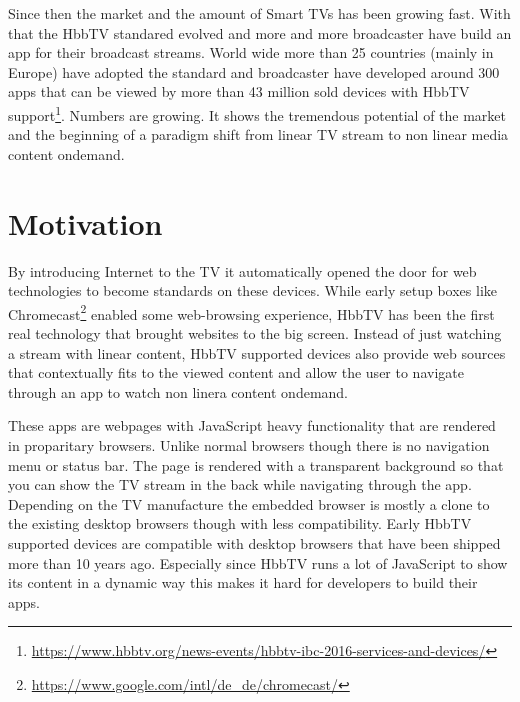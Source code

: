 Since then the market and the amount of Smart TVs has been growing fast. With that the HbbTV standared evolved
and more and more broadcaster have build an app for their broadcast streams. World wide more than 25 countries
(mainly in Europe) have adopted the standard and broadcaster have developed around 300 apps that can
be viewed by more than 43 million sold devices with HbbTV support\footnote{\url{https://www.hbbtv.org/news-events/hbbtv-ibc-2016-services-and-devices/}}.
Numbers are growing. It shows the tremendous potential of the market and the beginning of a paradigm shift
from linear TV stream to non linear media content ondemand.

\section{Motivation\label{sec:motivation}}

By introducing Internet to the TV it automatically opened the door for web technologies to become standards
on these devices. While early setup boxes like Chromecast\footnote{\url{https://www.google.com/intl/de_de/chromecast/}}
enabled some web-browsing experience, HbbTV has been the first real technology that brought websites to the big screen.
Instead of just watching a stream with linear content, HbbTV supported devices also provide web sources that
contextually fits to the viewed content and allow the user to navigate through an app to watch non linera content
ondemand.

These apps are webpages with JavaScript heavy functionality that are rendered in proparitary browsers. Unlike
normal browsers though there is no navigation menu or status bar. The page is rendered with a transparent background
so that you can show the TV stream in the back while navigating through the app. Depending on the TV manufacture
the embedded browser is mostly a clone to the existing desktop browsers though with less compatibility.
Early HbbTV supported devices are compatible with desktop browsers that have been shipped more than 10 years ago.
Especially since HbbTV runs a lot of JavaScript to show its content in a dynamic way this makes it hard for
developers to build their apps.

